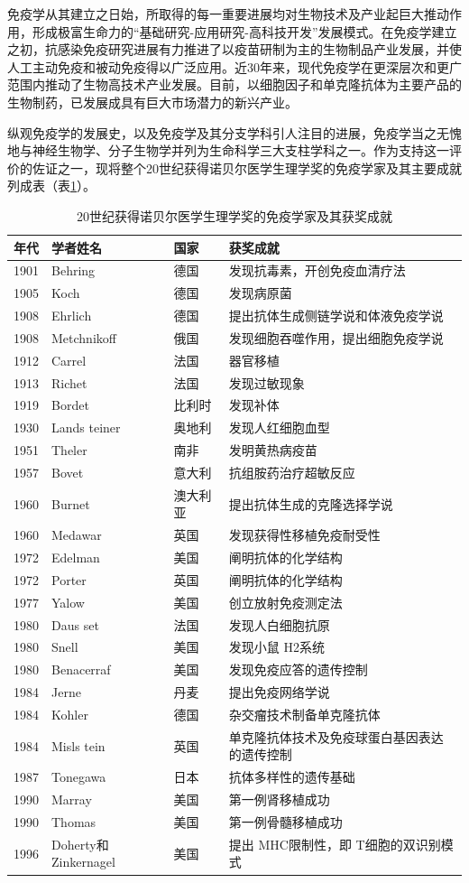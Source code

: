 免疫学从其建立之日始，所取得的每一重要进展均对生物技术及产业起巨大推动作用，形成极富生命力的“基础研究-应用研究-高科技开发”发展模式。在免疫学建立之初，抗感染免疫研究进展有力推进了以疫苗研制为主的生物制品产业发展，并使人工主动免疫和被动免疫得以广泛应用。近30年来，现代免疫学在更深层次和更广范围内推动了生物高技术产业发展。目前，以细胞因子和单克隆抗体为主要产品的生物制药，已发展成具有巨大市场潜力的新兴产业。

纵观免疫学的发展史，以及免疫学及其分支学科引人注目的进展，免疫学当之无愧地与神经生物学、分子生物学并列为生命科学三大支柱学科之一。作为支持这一评价的佐证之一，现将整个20世纪获得诺贝尔医学生理学奖的免疫学家及其主要成就列成表（表\ref{tab1-3}）。
　
\begin{longtable}{lllp{5cm}}
    \caption{20世纪获得诺贝尔医学生理学奖的免疫学家及其获奖成就}
    \label{tab1-3}\\
    \toprule
    年代&学者姓名&国家&获奖成就\\
    \midrule
    \endhead
    1901&Behring&德国&发现抗毒素，开创免疫血清疗法
\\
1905&Koch&德国&发现病原菌
\\
1908&Ehrlich&德国&提出抗体生成侧链学说和体液免疫学说
\\
1908&Metchnikoff&俄国&发现细胞吞噬作用，提出细胞免疫学说
\\
1912&Carrel&法国&器官移植
\\
1913&Richet&法国&发现过敏现象
\\
1919&Bordet&比利时&发现补体
\\
1930&Lands teiner&奥地利&发现人红细胞血型
\\
1951&Theler&南非&发明黄热病疫苗
\\
1957&Bovet&意大利&抗组胺药治疗超敏反应
\\
1960&Burnet&澳大利亚&提出抗体生成的克隆选择学说
\\
1960&Medawar&英国&发现获得性移植免疫耐受性
\\
1972&Edelman&美国&阐明抗体的化学结构
\\
1972&Porter&英国&阐明抗体的化学结构
\\
1977&Yalow&美国&创立放射免疫测定法
\\
1980&Daus set&法国&发现人白细胞抗原
\\
1980&Snell&美国&发现小鼠 H2系统
\\
1980&Benacerraf&美国&发现免疫应答的遗传控制
\\
1984&Jerne&丹麦&提出免疫网络学说
\\
1984&Kohler&德国&杂交瘤技术制备单克隆抗体
\\
1984&Misls tein&英国&单克隆抗体技术及免疫球蛋白基因表达的遗传控制
\\
1987&Tonegawa&日本&抗体多样性的遗传基础
\\
1990&Marray&美国&第一例肾移植成功
\\
1990&Thomas&美国&第一例骨髓移植成功
\\
1996&Doherty和Zinkernagel&美国&提出 MHC限制性，即 T细胞的双识别模式\\
    \bottomrule
    \end{longtable}







